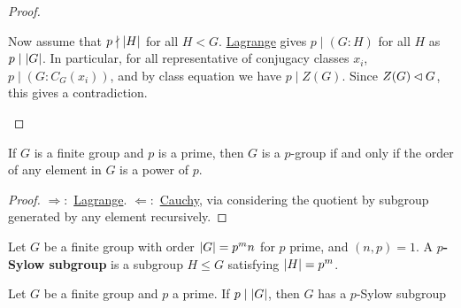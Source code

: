 \documentclass{article}
\begin{document}
\begin{proof}
\begin{enumerate}
\begin{itemize}
            Now assume that $p \nmid \left|H\right|$ for all $H < G$. \hyperref[thm: Lagrange]{Lagrange} gives $p \mid (G : H)$ for all $H$ as $p \mid \left|G\right|$. In particular, for all representative of conjugacy classes $x_i$, $p \mid (G : C_G(x_i))$, and by class equation we have $p \mid Z(G)$. Since $Z(G) \lhd G$, this gives a contradiction.
        \end{itemize}
    \end{enumerate}
\end{proof}

\begin{corollary}\label{cor: p group iff order of any element is a power of p}
    If $G$ is a finite group and $p$ is a prime, then $G$ is a $p$-group if and only if the order of any element in $G$ is a power of $p$.
\end{corollary}

\begin{proof}
    $\Rightarrow:$ \hyperref[thm: Lagrange]{Lagrange}. $\Leftarrow:$ \hyperref[thm: Cauchy]{Cauchy}, via considering the quotient by subgroup generated by any element recursively.
\end{proof}

\begin{definition}
    Let $G$ be a finite group with order $\left|G\right| = p^m n$ for $p$ prime, and $(n, p) = 1$. A \textbf{$p$-Sylow subgroup} is a subgroup $H \leq G$ satisfying $\left|H\right| = p^m$. 
\end{definition}

\begin{theorem}[Sylow I]\label{thm: Sylow I}
    Let $G$ be a finite group and $p$ a prime. If $p \mid \left|G\right|$, then $G$ has a $p$-Sylow subgroup
\end{theorem}
\end{document}
